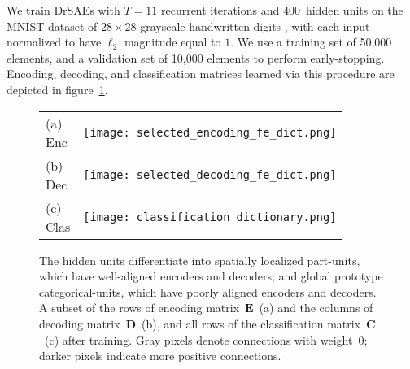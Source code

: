 \documentclass{article} %
\newcommand{\C}{\mathbf{C}}
\newcommand{\D}{\mathbf{D}}
\newcommand{\E}{\mathbf{E}}
\begin{document}
We train DrSAEs with $T=11$ recurrent iterations and $400$~hidden units on the MNIST dataset of $28 \times 28$ grayscale handwritten digits \citep{lecun1998}, with each input normalized to have $\ell_2$ magnitude equal to $1$.  We use a training set of 50,000 elements, and a validation set of 10,000 elements to perform early-stopping.
Encoding, decoding, and classification matrices learned via this procedure are depicted in figure~\ref{dictionary_figure}.

\begin{figure}[tbp]
  \begin{center}
    \begin{tabular}{p{0.10in}p{5.2in}}
      \parbox[b]{0in}{(a) \\ Enc \vspace{0.2cm}} & \texttt{[image: selected\_encoding\_fe\_dict.png]} \\
      \parbox[b]{0in}{(b) \\ Dec \vspace{0.2cm}} & \texttt{[image: selected\_decoding\_fe\_dict.png]} \\
      \parbox[b]{0in}{(c) \\ Clas \vspace{0.2cm}} & \texttt{[image: classification\_dictionary.png]} \\
    \end{tabular}
  \end{center}
  \caption{The hidden units differentiate into spatially localized part-units, which have well-aligned encoders and decoders; and global prototype categorical-units, which have poorly aligned encoders and decoders.  A subset of the rows of encoding matrix~$\E$~(a) and the columns of decoding matrix~$\D$~(b), and all rows of the classification matrix~$\C$~(c) after training. Gray pixels denote connections with weight~$0$; darker pixels indicate more positive connections.\label{dictionary_figure}} %
\end{figure}


\end{document}
